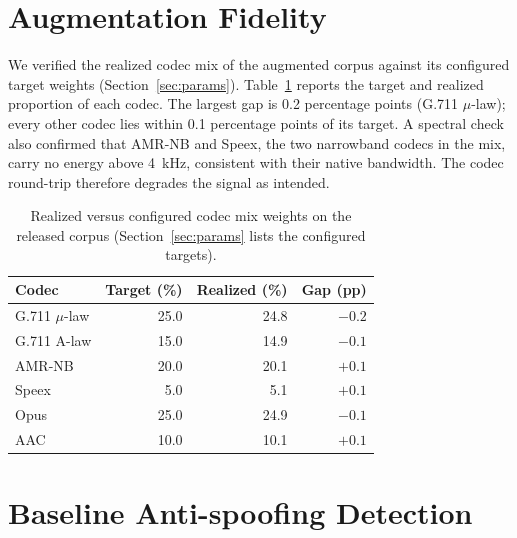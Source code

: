 \documentclass[11pt]{report}
\begin{document}
\section{Augmentation Fidelity}

We verified the realized codec mix of the augmented corpus
against its configured target weights (Section~\ref{sec:params}).
Table~\ref{tab:codecfidelity} reports the target and realized proportion
of each codec. The largest gap is 0.2 percentage points (G.711
$\mu$-law); every other codec lies within 0.1 percentage points of its
target. A spectral check also confirmed that AMR-NB and Speex, the two
narrowband codecs in the mix, carry no energy above \SI{4}{\kilo\hertz},
consistent with their native bandwidth. The codec round-trip therefore
degrades the signal as intended.

\begin{table}[H]
\centering
\caption{Realized versus configured codec mix weights on the released
corpus (Section~\ref{sec:params} lists the configured targets).}
\label{tab:codecfidelity}
\small
\begin{tabular}{lrrr}
\toprule
\textbf{Codec} & \textbf{Target (\%)} & \textbf{Realized (\%)} & \textbf{Gap (pp)} \\
\midrule
G.711 $\mu$-law & 25.0 & 24.8 & $-0.2$ \\
G.711 A-law     & 15.0 & 14.9 & $-0.1$ \\
AMR-NB          & 20.0 & 20.1 & $+0.1$ \\
Speex           &  5.0 &  5.1 & $+0.1$ \\
Opus            & 25.0 & 24.9 & $-0.1$ \\
AAC             & 10.0 & 10.1 & $+0.1$ \\
\bottomrule
\end{tabular}
\end{table}

\section{Baseline Anti-spoofing Detection}
\label{sec:baseline}
\end{document}
